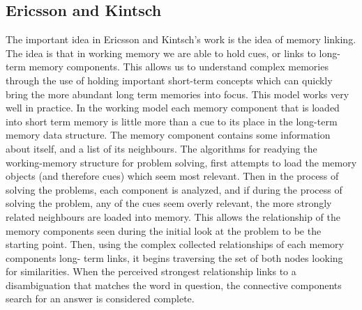 \subsection{Ericsson and Kintsch}

The important idea in Ericsson and Kintsch's work is the idea of memory linking.
The idea is that in working memory we are able to hold cues, or links to long-
term memory components.  This allows us to understand complex memories through
the use of holding important short-term concepts which can quickly bring the
more abundant long term memories into focus.  This model works very well in
practice.  In the working model each memory component that is loaded into short
term memory is little more than a cue to its place in the long-term memory data
structure.  The memory component contains some information about itself, and a
list of its neighbours.  The algorithms for readying the working-memory
structure for problem solving, first attempts to load the memory objects (and
therefore cues) which seem most relevant.  Then in the process of solving the
problems, each component is analyzed, and if during the process of solving the
problem, any of the cues seem overly relevant, the more strongly related
neighbours are loaded into memory.  This allows the relationship of the memory
components seen during the initial look at the problem to be the starting point.
Then, using the complex collected relationships of each memory components long-
term links, it begins traversing the set of both nodes looking for similarities.
When the perceived strongest relationship links to a disambiguation that matches
the word in question, the connective components search for an answer is
considered complete.

